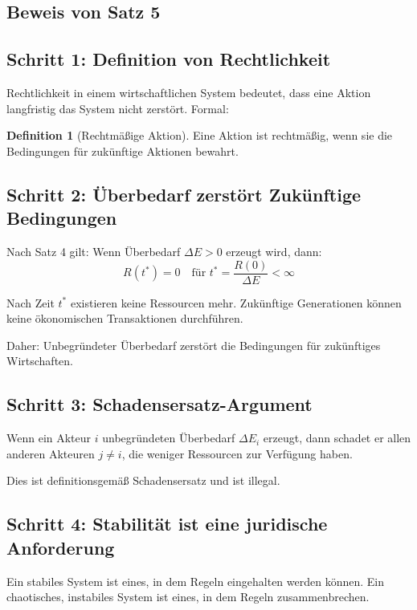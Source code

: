 \documentclass[a4paper, 12pt, twoside, openright]{report}
\theoremstyle{definition}
\newtheorem{definition}[theorem]{Definition}
\theoremstyle{definition}
\begin{document}
\subsection{Beweis von Satz 5}

\subsection{Schritt 1: Definition von Rechtlichkeit}

Rechtlichkeit in einem wirtschaftlichen System bedeutet, dass eine Aktion langfristig das System nicht zerstört. Formal:

\begin{definition}[Rechtmäßige Aktion]
    Eine Aktion ist rechtmäßig, wenn sie die Bedingungen für zukünftige Aktionen bewahrt.
\end{definition}

\subsection{Schritt 2: Überbedarf zerstört Zukünftige Bedingungen}

Nach Satz 4 gilt: Wenn Überbedarf $\Delta E > 0$ erzeugt wird, dann:
\begin{equation}
    R(t^*) = 0 \quad \text{für } t^* = \frac{R(0)}{\Delta E} < \infty
\end{equation}

Nach Zeit $t^*$ existieren keine Ressourcen mehr. Zukünftige Generationen können keine ökonomischen Transaktionen durchführen.

Daher: Unbegründeter Überbedarf zerstört die Bedingungen für zukünftiges Wirtschaften.

\subsection{Schritt 3: Schadensersatz-Argument}

Wenn ein Akteur $i$ unbegründeten Überbedarf $\Delta E_i$ erzeugt, dann schadet er allen anderen Akteuren $j \neq i$, die weniger Ressourcen zur Verfügung haben.

Dies ist definitionsgemäß Schadensersatz und ist illegal.

\subsection{Schritt 4: Stabilität ist eine juridische Anforderung}

Ein stabiles System ist eines, in dem Regeln eingehalten werden können. Ein chaotisches, instabiles System ist eines, in dem Regeln zusammenbrechen.
\end{document}
